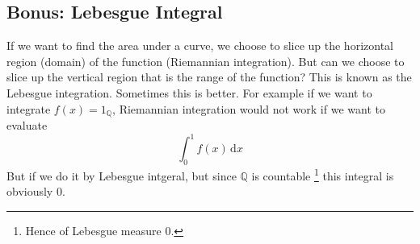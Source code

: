 \subsection{Bonus: Lebesgue Integral}
If we want to find the area under a curve, we choose to slice up the horizontal region (domain) of the function (Riemannian integration).
But can we choose to slice up the vertical region that is the range of the function?
This is known as the Lebesgue integration.
Sometimes this is better.
For example if we want to integrate $f(x)=1_{\mathbb Q}$, Riemannian integration would not work if we want to evaluate
$$\int_0^1f(x)\,\mathrm dx$$
But if we do it by Lebesgue intgeral, but since $\mathbb Q$ is countable
\footnote{Hence of Lebesgue measure $0$.}
this integral is obviously $0$.